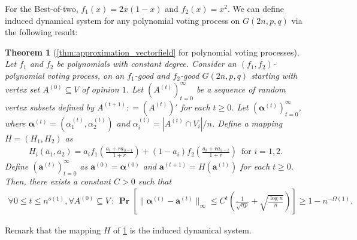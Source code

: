 \documentclass[letterpaper,11pt]{article}
\newtheorem{theorem}{Theorem}[section]
\renewcommand\Pr{\mathop{\mathbf{Pr}}}
\def\defeq{\mathrel{\mathop:}=}%
\begin{document}
For the Best-of-two, $f_1(x)=2x(1-x)$ and $f_2(x)=x^2$.
%
We can define induced dynamical system for any polynomial voting process on $G(2n,p,q)$ via the following result:
%
\begin{theorem}[\cref{thm:approximation_vectorfield} for polynomial voting processes]\label{thm:approximation_vectorfield_general}
Let $f_1$ and $f_2$ be polynomials with constant degree.
Consider an $(f_1,f_2)$-polynomial voting process, on an $f_1$-good and $f_2$-good $G(2n,p,q)$ starting with vertex set $A^{(0)}\subseteq V$ of opinion $1$.
Let $(A^{(t)})_{t=0}^{\infty}$ be a sequence of random vertex subsets defined by $A^{(t+1)}\defeq (A^{(t)})'$ for each $t\geq 0$.
Let $({\boldsymbol \alpha}^{(t)})_{t=0}^{\infty}$, where ${\boldsymbol \alpha}^{(t)}=(\alpha^{(t)}_1,\alpha^{(t)}_2)$ and $\alpha^{(t)}_i=|A^{(t)}\cap V_i|/n$.
Define a mapping $H=(H_1,H_2)$ as
\begin{align*}
H_i(a_1,a_2)=a_i f_1\left(\frac{a_i+ra_{3-i}}{1+r}\right)
+
(1-a_i) f_2\left(\frac{a_i+ra_{3-i}}{1+r}\right) \,\,\,\text{for $i=1,2$}.
\end{align*}
Define $(\mathbf{a}^{(t)})_{t=0}^\infty$ as $\mathbf{a}^{(0)}={\boldsymbol \alpha}^{(0)}$ and $\mathbf{a}^{(t+1)}=H(\mathbf{a}^{(t)})$ for each $t\geq 0$. 
Then, %
there exists a constant $C>0$ such that
\begin{align*}
\forall 0\leq t\leq n^{o(1)},\forall A^{(0)}\subseteq V\,:\,\Pr\left[\|{\boldsymbol \alpha}^{(t)}-\mathbf{a}^{(t)}\|_\infty \leq C^t \left(\frac{1}{\sqrt{np}}+\sqrt{\frac{\log n}{n}}\right)\right] \geq 1-n^{-\Omega(1)}.
\end{align*}
\end{theorem}
%
Remark that the mapping $H$ of \cref{thm:approximation_vectorfield_general} is the induced dynamical system.
\end{document}
